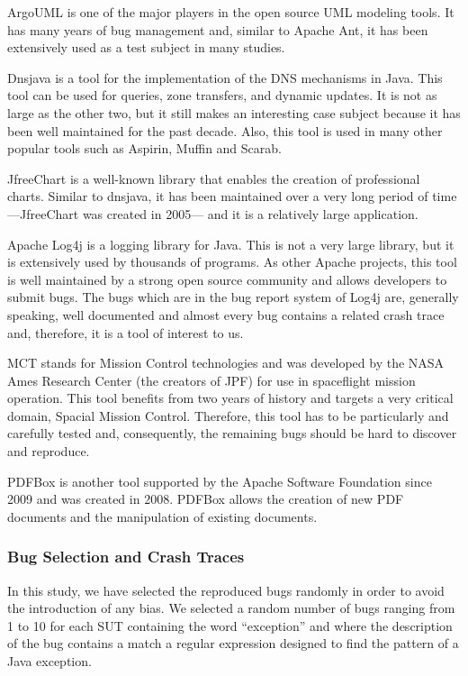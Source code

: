 ArgoUML \cite{CollabNet} is one of the major players in the open source
UML modeling tools. It has many years of bug management
and, similar to Apache Ant, it has been extensively used as a
test subject in many studies.

Dnsjava \cite{Wellington2013} is a tool for the implementation of the DNS
mechanisms in Java. This tool can be used for queries, zone
transfers, and dynamic updates. It is not as large as the other
two, but it still makes an interesting case subject because it has
been well maintained for the past decade. Also, this tool is
used in many other popular tools such as Aspirin, Muffin and
Scarab.

JfreeChart \cite{ObjectRefineryLimited2005} is a well-known library that enables the
creation of professional charts. Similar to dnsjava, it has been
maintained over a very long period of time —JfreeChart was
created in 2005— and it is a relatively large application.

Apache Log4j \cite{TheApacheSoftwareFoundation1999} is a logging library for Java. This is not a
very large library, but it is extensively used by thousands of
programs. As other Apache projects, this tool is well
maintained by a strong open source community and allows
developers to submit bugs. The bugs which are in the bug
report system of Log4j are, generally speaking, well
documented and almost every bug contains a related crash
trace and, therefore, it is a tool of interest to us.

MCT \cite{NASA2009} stands for Mission Control technologies and was
developed by the NASA Ames Research Center (the creators
of JPF) for use in spaceflight mission operation. This tool
benefits from two years of history and targets a very critical
domain, Spacial Mission Control. Therefore, this tool has to
be particularly and carefully tested and, consequently, the
remaining bugs should be hard to discover and reproduce.

PDFBox \cite{ApacheSoftwareFoundation2014} is another tool supported by the Apache
Software Foundation since 2009 and was created in 2008.
PDFBox allows the creation of new PDF documents and the
manipulation of existing documents.

\subsubsection{Bug Selection and Crash Traces}

In this study, we have selected the reproduced bugs randomly
in order to avoid the introduction of any bias. We selected a
random number of bugs ranging from 1 to 10 for each SUT
containing the word ``exception'' and where the description of
the bug contains a match a regular expression designed to find the pattern of a
Java exception.


